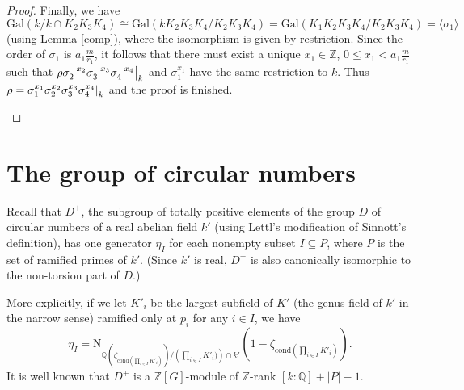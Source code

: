 \documentclass[12pt,a4paper]{article}
\newcommand{\Qbb}{\mathbb{Q}}
\newcommand{\Zbb}{\mathbb{Z}}
\newcommand{\Q}{\mathbb{Q}}
\newcommand{\Z}{\mathbb{Z}}
\newcommand{\Gal}{\mathrm{Gal}}
\newcommand\restr[2]{{%
  \left.\kern-\nulldelimiterspace %
  #1 %
  \right|_{#2} %
  }}
\begin{document}
\begin{proof}
Finally, we have $$\Gal(k/k\cap K_2K_3K_4)\cong \Gal(kK_2K_3K_4/K_2K_3K_4)=\Gal(K_1K_2K_3K_4/K_2K_3K_4)=\langle\sigma_1\rangle$$
(using Lemma \ref{comp}), where the isomorphism is given by restriction. Since the order of $\sigma_1$ is $a_1\frac{m}{r_1}$, it follows that there must exist a unique $x_1\in \Z$, $0\leq x_1<a_1\frac{m}{r_1}$ such that $\rho\restr{\sigma_2^{-x_2}\sigma_3^{-x_3}\sigma_4^{-x_4}}{k}$ and $\sigma_1^{x_1}$ have the same restriction to $k$. Thus $\rho=\restr{\sigma_1^{x_1}\sigma_2^{x_2}\sigma_3^{x_3}\sigma_4^{x_4}}{k}$ and the proof is finished.
\begin{center}
\end{center}
\end{proof}

\section{The group of circular numbers}

Recall that $D^+$, the subgroup of totally positive elements of the group $D$ of circular numbers of a real abelian field $k'$ (using Lettl's modification of Sinnott's definition), has one generator $\eta_I$ for each nonempty subset $I\subseteq P$, where $P$ is the set of ramified primes of $k'$. (Since $k'$ is real, $D^+$ is also canonically isomorphic to the non-torsion part of $D$.) 

More explicitly, if we let $K'_i$ be the largest subfield of $K'$ (the genus field of $k'$ in the narrow sense) ramified only at $p_i$ for any $i\in I$, we have
$$\eta_I=\text{N}_{\Qbb(\zeta_{\text{cond} \left(\prod_{i\in I}K'_i\right)})/\left(\prod_{i\in I}K'_i)\right)\cap k'}\left(1-\zeta_{\text{cond} \left(\prod_{i\in I}K'_i\right)}\right).$$
It is well known that $D^+$ is a $\Zbb[G]$-module of $\Zbb$-rank $[k:\Qbb]+|P|-1$. 
\end{document}
